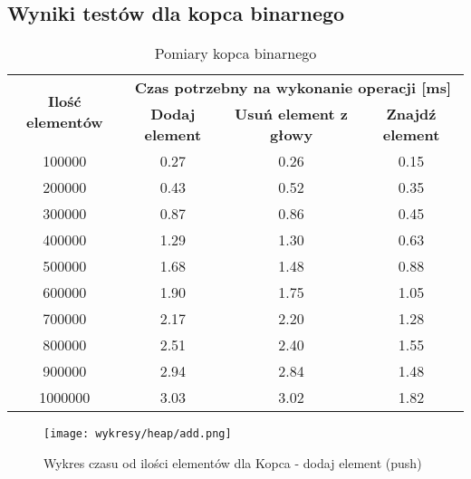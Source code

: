 \documentclass{article}
\begin{document}
    \subsection{Wyniki testów dla kopca binarnego}
    \begin{table}[H]
        \centering
        \begin{tabular}{|c|ccc|}
            \hline
            \multirow{2}{*}{\textbf{Ilość   elementów}} & \multicolumn{3}{c|}{\textbf{Czas   potrzebny na wykonanie operacji {[}ms{]}}} \\ \cline{2-4} 
             & \multicolumn{1}{c|}{\textbf{Dodaj element}} & \multicolumn{1}{c|}{\textbf{Usuń element z głowy}} & \textbf{Znajdź element} \\ \hline
            100000 & \multicolumn{1}{c|}{0.27} & \multicolumn{1}{c|}{0.26} & 0.15 \\ \hline
            200000 & \multicolumn{1}{c|}{0.43} & \multicolumn{1}{c|}{0.52} & 0.35 \\ \hline
            300000 & \multicolumn{1}{c|}{0.87} & \multicolumn{1}{c|}{0.86} & 0.45 \\ \hline
            400000 & \multicolumn{1}{c|}{1.29} & \multicolumn{1}{c|}{1.30} & 0.63 \\ \hline
            500000 & \multicolumn{1}{c|}{1.68} & \multicolumn{1}{c|}{1.48} & 0.88 \\ \hline
            600000 & \multicolumn{1}{c|}{1.90} & \multicolumn{1}{c|}{1.75} & 1.05 \\ \hline
            700000 & \multicolumn{1}{c|}{2.17} & \multicolumn{1}{c|}{2.20} & 1.28 \\ \hline
            800000 & \multicolumn{1}{c|}{2.51} & \multicolumn{1}{c|}{2.40} & 1.55 \\ \hline
            900000 & \multicolumn{1}{c|}{2.94} & \multicolumn{1}{c|}{2.84} & 1.48 \\ \hline
            1000000 & \multicolumn{1}{c|}{3.03} & \multicolumn{1}{c|}{3.02} & 1.82 \\ \hline
        \end{tabular}
        \caption{Pomiary kopca binarnego}
    \end{table}


    
    \begin{figure}[H]
        \centering
        \texttt{[image: wykresy/heap/add.png]}
        \caption{Wykres czasu od ilości elementów dla Kopca - dodaj element (push)}
    \end{figure}
    
\end{document}
